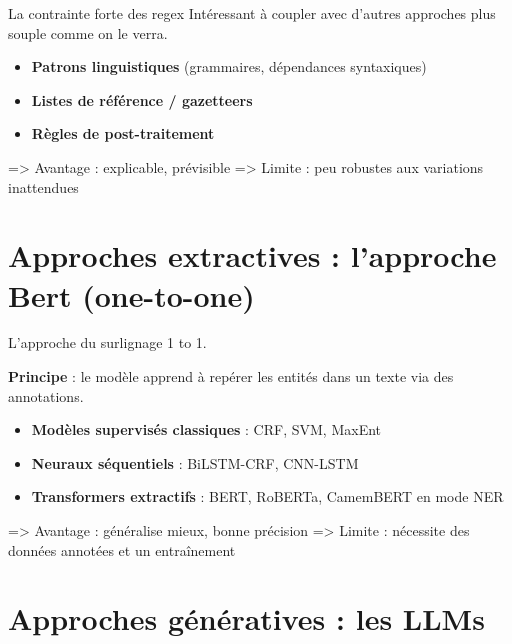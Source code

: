 La contrainte forte des regex Intéressant à coupler avec d'autres approches plus souple comme on le verra.

\begin{itemize}
\item \textbf{Patrons linguistiques} (grammaires, dépendances syntaxiques)
\end{itemize}

\begin{itemize}
\item \textbf{Listes de référence / gazetteers}
\end{itemize}

\begin{itemize}
\item \textbf{Règles de post-traitement}  
\end{itemize}
  => Avantage : explicable, prévisible  
  => Limite : peu robustes aux variations inattendues

\section{Approches extractives : l'approche Bert (one-to-one)}

L'approche du surlignage 1 to 1.

\textbf{Principe} : le modèle apprend à repérer les entités dans un texte via des annotations.

\begin{itemize}
\item \textbf{Modèles supervisés classiques} : CRF, SVM, MaxEnt
\end{itemize}

\begin{itemize}
\item \textbf{Neuraux séquentiels} : BiLSTM-CRF, CNN-LSTM
\end{itemize}

\begin{itemize}
\item \textbf{Transformers extractifs} : BERT, RoBERTa, CamemBERT en mode NER  
\end{itemize}
  => Avantage : généralise mieux, bonne précision  
  => Limite : nécessite des données annotées et un entraînement

\section{Approches génératives : les LLMs}

